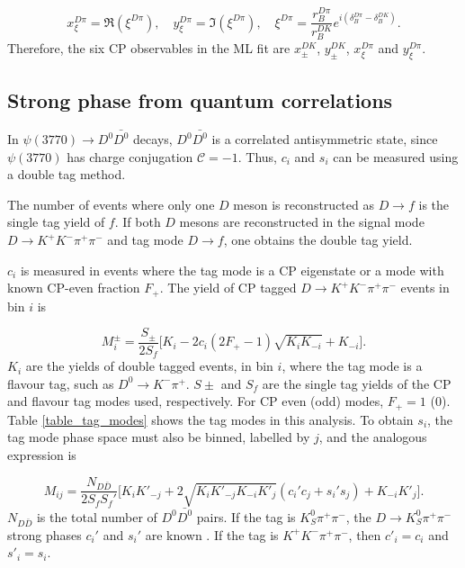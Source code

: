 \documentclass[12pt, a4paper, notitlepage, onecolumn]{article}
\begin{document}
\begin{equation}
  x_\xi^{D\pi} = \Re(\xi^{D\pi}), \quad y_\xi^{D\pi} = \Im(\xi^{D\pi}), \quad \xi^{D\pi} = \frac{r_B^{D\pi}}{r_B^{DK}}e^{i(\delta_B^{D\pi} - \delta_B^{DK})}.
\end{equation}
Therefore, the six CP observables in the ML fit are $x_\pm^{DK}$, $y_\pm^{DK}$, $x_\xi^{D\pi}$ and $y_\xi^{D\pi}$.

\subsection{Strong phase from quantum correlations}
In $\psi(3770)\to D^0\bar{D^0}$ decays, $D^0\bar{D^0}$ is a correlated antisymmetric state, since $\psi(3770)$ has charge conjugation $\mathcal{C} = -1$. Thus, $c_i$ and $s_i$ can be measured using a double tag method.

The number of events where only one $D$ meson is reconstructed as $D\to f$ is the single tag yield of $f$. If both $D$ mesons are reconstructed in the signal mode $D\to K^+K^-\pi^+\pi^-$ and tag mode $D\to f$, one obtains the double tag yield.

$c_i$ is measured in events where the tag mode is a CP eigenstate or a mode with known CP-even fraction $F_+$. The yield of CP tagged $D\to K^+K^-\pi^+\pi^-$ events in bin $i$ is

\begin{equation}
  M_i^\pm = \frac{S_\pm}{2S_f}\Big[K_i - 2c_i(2F_+ - 1)\sqrt{K_iK_{-i}} + K_{-i}\Big].
  \label{eq_Mi}
\end{equation}
$K_i$ are the yields of double tagged events, in bin $i$, where the tag mode is a flavour tag, such as $D^0\to K^-\pi^+$. $S\pm$ and $S_f$ are the single tag yields of the CP and flavour tag modes used, respectively. For CP even (odd) modes, $F_+ = 1$ ($0$). Table \ref{table_tag_modes} shows the tag modes in this analysis. To obtain $s_i$, the tag mode phase space must also be binned, labelled by $j$, and the analogous expression is

\begin{equation}
  M_{ij} = \frac{N_{D\bar{D}}}{2S_fS_f'}\Big[K_iK'_{-j} + 2\sqrt{K_iK'_{-j}K_{-i}K'_j}(c_i'c_j + s_i's_j) + K_{-i}K'_j\Big].
  \label{eq_Mij}
\end{equation}
$N_{D\bar{D}}$ is the total number of $D^0\bar{D^0}$ pairs. If the tag is $K_S^0\pi^+\pi^-$, the $D\to K_S^0\pi^+\pi^-$ strong phases $c_i'$ and $s_i'$ are known \cite{cite_KSKKAnalysis}. If the tag is $K^+K^-\pi^+\pi^-$, then $c'_i = c_i$ and $s'_i = s_i$.
\end{document}
